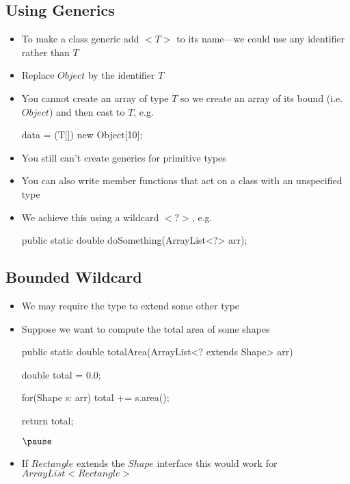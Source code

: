 \begin{slide}
\section{Using Generics}

\vspace*{-2cm}
\begin{PauseHighLight}
  \begin{itemize}\squeeze
  \item To make a class generic add \jl$<T>$ to its name\pause---we
    could use any identifier rather than  \jl$T$\pause
  \item Replace \jl$Object$ by the identifier \jl$T$\pause
  \item You cannot create an array of type \jl$T$ so we create an array
    of its bound (i.e. \jl$Object$) and then cast to \jl$T$, e.g.
    \begin{java}
      data = (T[]) new Object[10];
    \end{java}\pause
    \vspace*{-1cm}
  \item You still can't create generics for primitive types\pause
  \item You can also write member functions that act on a class with an
    unspecified type\pause
  \item We achieve this using a wildcard \jl$<?>$, e.g.
    \begin{java}
      public static double doSomething(ArrayList<?> arr);
    \end{java}\pause
    \vspace*{-1cm}
  \end{itemize}
\end{PauseHighLight}
\end{slide}



\begin{slide}
\section{Bounded Wildcard}

\begin{PauseHighLight}
  \begin{itemize}
  \item We may require the type to extend some other type\pause
  \item Suppose we want to compute the total area of some shapes
\begin{java}
  public static double totalArea(ArrayList<? extends Shape> arr)
  {
    double total = 0.0;

    for(Shape s: arr)
        total += s.area();

    return total;
  }$\pause$
\end{java}
  \item If \jl$Rectangle$ extends the \jl$Shape$ interface this
    would work for \jl$ArrayList<Rectangle>$\pause
  \end{itemize}
\end{PauseHighLight}
\end{slide}


